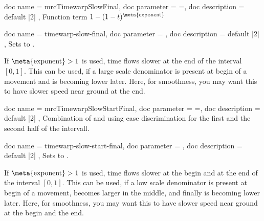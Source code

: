 \begin{docCommands}[
    doc new     = 2024-07-31,
  ]{
    {
      doc name        = mrcTimewarpSlowFinal,
      doc parameter   = {=},
      doc description = {default |2|}
    },
  }
  Function term $1 - (1-t)^{\text{\meta{exponent}}}$
\end{docCommands}


\begin{docMrcKeys}[
    doc keypath = anim,
    doc new     = 2024-07-31,
  ]{
    {
      doc name        = timewarp-slow-final,
      doc parameter   = ,
      doc description = {default |2|}
    },
  }
  Sets  to .
  \par
  If $\text{\meta{exponent}}>1$ is used, time flows slower at the end of the
  interval \mbox{$[0,1]$}. This can be used, if a large scale denominator is
  present at begin of a movement and is becoming lower later. Here, for smoothness,
  you may want this to have slower speed near ground at the end.
\end{docMrcKeys}


\begin{docCommands}[
    doc new     = 2024-07-31,
  ]{
    {
      doc name        = mrcTimewarpSlowStartFinal,
      doc parameter   = {=},
      doc description = {default |2|}
    },
  }
  Combination of  and 
  using case discrimination for the first and the second half of the intervall.
\end{docCommands}


\begin{docMrcKeys}[
    doc keypath = anim,
    doc new     = 2024-07-31,
  ]{
    {
      doc name        = timewarp-slow-start-final,
      doc parameter   = ,
      doc description = {default |2|}
    },
  }
  Sets  to .
  \par
  If $\text{\meta{exponent}}>1$ is used, time flows slower at the begin and at the end of the
  interval \mbox{$[0,1]$}. This can be used, if a low scale denominator is
  present at begin of a movement, becomes larger in the middle, and finally
  is becoming lower later. Here, for smoothness,
  you may want this to have slower speed near ground at the begin and the end.
\end{docMrcKeys}


